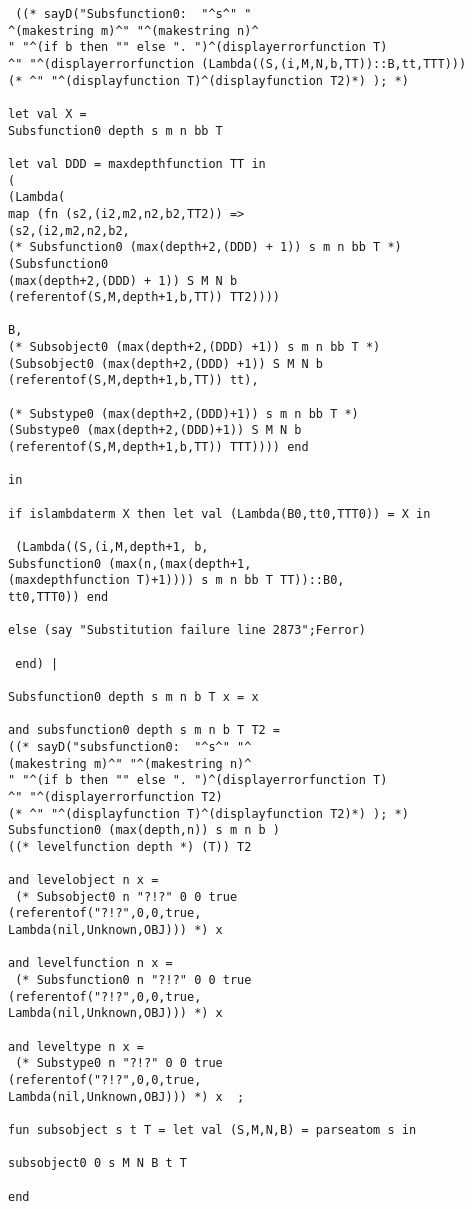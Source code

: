 \documentclass[12pt]{article}
\begin{document}
\begin{verbatim}
 ((* sayD("Subsfunction0:  "^s^" "
^(makestring m)^" "^(makestring n)^
" "^(if b then "" else ". ")^(displayerrorfunction T)
^" "^(displayerrorfunction (Lambda((S,(i,M,N,b,TT))::B,tt,TTT)))
(* ^" "^(displayfunction T)^(displayfunction T2)*) ); *)

let val X = 
Subsfunction0 depth s m n bb T

let val DDD = maxdepthfunction TT in
(
(Lambda(
map (fn (s2,(i2,m2,n2,b2,TT2)) =>
(s2,(i2,m2,n2,b2,
(* Subsfunction0 (max(depth+2,(DDD) + 1)) s m n bb T *)
(Subsfunction0 
(max(depth+2,(DDD) + 1)) S M N b
(referentof(S,M,depth+1,b,TT)) TT2)))) 

B,
(* Subsobject0 (max(depth+2,(DDD) +1)) s m n bb T *)
(Subsobject0 (max(depth+2,(DDD) +1)) S M N b 
(referentof(S,M,depth+1,b,TT)) tt),

(* Substype0 (max(depth+2,(DDD)+1)) s m n bb T *)
(Substype0 (max(depth+2,(DDD)+1)) S M N b 
(referentof(S,M,depth+1,b,TT)) TTT)))) end

in

if islambdaterm X then let val (Lambda(B0,tt0,TTT0)) = X in

 (Lambda((S,(i,M,depth+1, b,
Subsfunction0 (max(n,(max(depth+1,
(maxdepthfunction T)+1)))) s m n bb T TT))::B0,
tt0,TTT0)) end

else (say "Substitution failure line 2873";Ferror)

 end) |

Subsfunction0 depth s m n b T x = x

and subsfunction0 depth s m n b T T2 =
((* sayD("subsfunction0:  "^s^" "^
(makestring m)^" "^(makestring n)^
" "^(if b then "" else ". ")^(displayerrorfunction T)
^" "^(displayerrorfunction T2)
(* ^" "^(displayfunction T)^(displayfunction T2)*) ); *)
Subsfunction0 (max(depth,n)) s m n b )
((* levelfunction depth *) (T)) T2

and levelobject n x = 
 (* Subsobject0 n "?!?" 0 0 true 
(referentof("?!?",0,0,true,
Lambda(nil,Unknown,OBJ))) *) x 

and levelfunction n x = 
 (* Subsfunction0 n "?!?" 0 0 true 
(referentof("?!?",0,0,true,
Lambda(nil,Unknown,OBJ))) *) x 

and leveltype n x = 
 (* Substype0 n "?!?" 0 0 true 
(referentof("?!?",0,0,true,
Lambda(nil,Unknown,OBJ))) *) x  ;

fun subsobject s t T = let val (S,M,N,B) = parseatom s in

subsobject0 0 s M N B t T

end




\end{verbatim}
\end{document}
